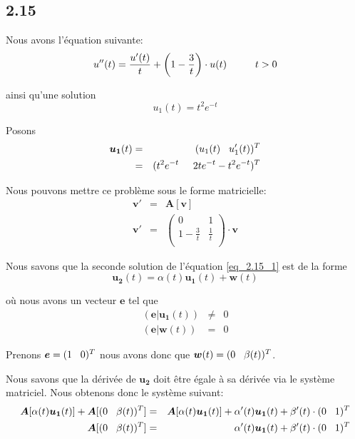 \documentclass[fontsize=12pt]{article}
\begin{document}
\subsection*{2.15}
Nous avons l'équation suivante:
\begin{equation} \label{eq_2.15_1}
u''(t) = \frac{u'(t)}{t} + \left( 1 - \frac{3}{t} \right) \cdot u(t)  \hspace{1 cm } t>0
\end{equation}

ainsi qu'une solution
\begin{equation}
u_1(t) = t^2 e^{-t}
\end{equation}

Posons
\begin{eqnarray}
\bm{u_1}(t) &=& (u_1(t)  \hspace{0.3cm}u_1'(t))^T\\
&=&(t^2 e^{-t} \hspace{0.5cm} 2t e^{-t} -t^2 e^{-t} )^T
\end{eqnarray}



Nous pouvons mettre ce problème sous le forme matricielle:
\begin{eqnarray*}
\bm{v}' &=& \bm{A}[\bm{v}]\\
\bm{v}'&=&\left(
\begin {matrix}
 0&1 \\
 1-\frac{3}{t}&\frac{1}{t} \\
\end{matrix}
\right) \cdot \bm{v}
\end{eqnarray*}

Nous savons que la seconde solution de l'équation \ref{eq_2.15_1} est de la forme
\begin{equation}
\bm{u_2}(t) = \alpha(t) \bm{u_1}(t) + \bm{w}(t)
\end{equation}

où nous avons un vecteur $\bm{e}$ tel que
\begin{eqnarray*}
(\bm{e}|\bm{u_1}(t)) &\neq& 0\\
(\bm{e}|\bm{w}(t))&=&0
\end{eqnarray*}

Prenons $\bm{e}=(1\hspace{0.3cm}0)^T$ nous avons donc que $\bm{w}(t) = (0\hspace{0.3cm}\beta(t))^T$.

Nous savons que la dérivée de $\bm{u_2}$ doit être égale à sa dérivée via le système matriciel. Nous obtenons donc le système suivant:
\begin{eqnarray}
\bm{A}[\alpha(t) \bm{u_1}(t)]+\bm{A}[(0 \hspace{0.3 cm} \beta(t))^T] &=& \bm{A}[\alpha(t)\bm{u_1}(t)] + \alpha'(t)\bm{u_1}(t)+\beta'(t)\cdot (0 \hspace{0.3 cm} 1)^T\\
\bm{A}[(0 \hspace{0.3 cm} \beta(t))^T] &=&  \alpha'(t)\bm{u_1}(t)+\beta'(t)\cdot (0 \hspace{0.3 cm} 1)^T
\end{eqnarray}
\end{document}
